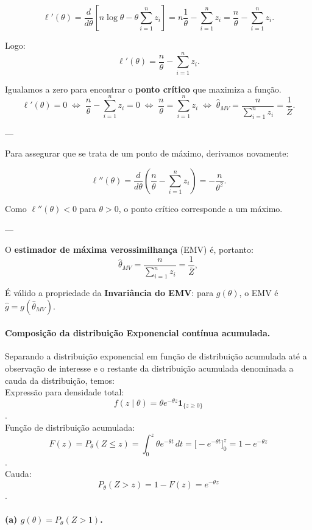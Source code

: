 \[
\ell'(\theta)
=\frac{d}{d\theta}[n\log\theta-\theta\sum_{i=1}^n z_i]
=n\frac{1}{\theta}-\sum_{i=1}^n z_i
=\frac{n}{\theta}-\sum_{i=1}^n z_i.
\]

Logo:
\[
\boxed{
\ell'(\theta)
=\frac{n}{\theta}-\sum_{i=1}^n z_i.}
\]

Igualamos a zero para encontrar o \textbf{ponto crítico} que maximiza a função. 
\[
\ell'(\theta)=0
\;\Longleftrightarrow\;
\frac{n}{\theta}-\sum_{i=1}^n z_i=0
\;\Longleftrightarrow\;
\frac{n}{\theta}=\sum_{i=1}^n z_i
\;\Longleftrightarrow\;
\widehat\theta_{MV}=\frac{n}{\sum_{i=1}^n z_i}
=\frac{1}{\overline Z}.
\]

---

Para assegurar que se trata de um ponto de máximo, derivamos novamente:

\[
\ell''(\theta)
=\frac{d}{d\theta}\!\left(\frac{n}{\theta}-\sum_{i=1}^n z_i\right)
=-\frac{n}{\theta^2}.
\]

Como $\ell''(\theta)<0$ para $\theta>0$,
o ponto crítico corresponde a um máximo.

---

O \textbf{estimador de máxima verossimilhança} (EMV) é, portanto:
\[
\boxed{\widehat\theta_{MV}=\frac{n}{\sum_{i=1}^n z_i}
=\frac{1}{\overline Z}},
\]

\medskip
É válido a propriedade da \textbf{Invariância do EMV}: para $g(\theta)$, o EMV é $\widehat g=g(\widehat\theta_{MV})$.

\paragraph{Composição da distribuição Exponencial contínua acumulada.} \newline
\vspace{1em}
Separando a distribuição exponencial em função de distribuição acumulada até a observação de interesse e 
o restante da distribuição acumulada denominada a cauda da distribuição, temos:
 \\[1em]
Expressão para densidade total: \[f(z\mid\theta)=\theta e^{-\theta z}\mathbf 1_{\{z\ge0\}}\]. \\
Função de distribuição acumulada: \[F(z)=P_\theta(Z\le z)=\int_0^z \theta e^{-\theta t}\,dt
      =\big[-e^{-\theta t}\big]_0^z=1-e^{-\theta z}\]. \\
Cauda: \[P_\theta(Z>z)=1-F(z)=e^{-\theta z}\].

\bigskip
\paragraph{(a) \(g(\theta)=P_\theta(Z>1)\).}

